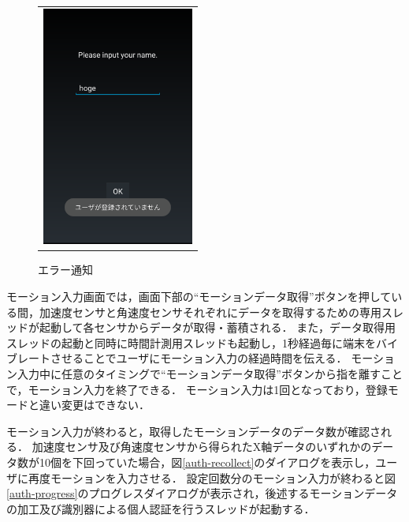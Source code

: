 \begin{figure}[bthp]
\begin{tabular}{c}
\begin{minipage}{0.33\hsize}
      \caption{認証画面}
      \label{authentication}
    \end{minipage}
    \begin{minipage}{0.33\hsize}
      \centering
      \includegraphics[bb=0 0 1080 1705, width=5cm]{Screenshots/auth-input-name-toast.pdf}
      \caption{エラー通知}
      \label{auth-input-name-toast}
    \end{minipage}
  \end{tabular}
\end{figure}


モーション入力画面では，画面下部の``モーションデータ取得''ボタンを押している間，加速度センサと角速度センサそれぞれにデータを取得するための専用スレッドが起動して各センサからデータが取得・蓄積される．
また，データ取得用スレッドの起動と同時に時間計測用スレッドも起動し，1秒経過毎に端末をバイブレートさせることでユーザにモーション入力の経過時間を伝える．
モーション入力中に任意のタイミングで``モーションデータ取得''ボタンから指を離すことで，モーション入力を終了できる．
モーション入力は1回となっており，登録モードと違い変更はできない．

モーション入力が終わると，取得したモーションデータのデータ数が確認される．
加速度センサ及び角速度センサから得られたX軸データのいずれかのデータ数が10個を下回っていた場合，図\ref{auth-recollect}のダイアログを表示し，ユーザに再度モーションを入力させる．
設定回数分のモーション入力が終わると図\ref{auth-progress}のプログレスダイアログが表示され，後述するモーションデータの加工及び識別器による個人認証を行うスレッドが起動する．

